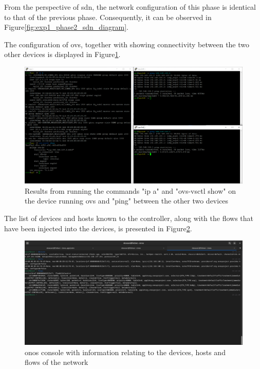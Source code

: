 From the perspective of \gls{sdn}, the network configuration of this phase is identical to that of the previous phase. Consequently, it can be observed in Figure\ref{fig:exp1_phase2_sdn_diagram}.

The configuration of \gls{ovs}, together with showing connectivity between the two other devices is displayed in Figure\ref{fig:exp1_phase3_pings}.

\begin{figure}
	\centering
	\includegraphics[width=\textwidth]{Chapters/Figures/tests/ovs_phase_3/ovs_config_&_pings.PNG}
	\caption{Results from running the commands "ip a" and "ovs-vsctl show" on the device running \gls{ovs} and "ping" between the other two devices}
	\label{fig:exp1_phase3_pings}
\end{figure}

The list of devices and hosts known to the controller, along with the flows that have been injected into the devices, is presented in Figure\ref{fig:exp1_phase3_onos}.

\begin{figure}
	\centering
	\includegraphics[width=\textwidth]{Chapters/Figures/tests/ovs_phase_3/onos_topology_&_config.PNG}
	\caption{\gls{onos} console with information relating to the devices, hosts and flows of the network}
	\label{fig:exp1_phase3_onos}
\end{figure}

